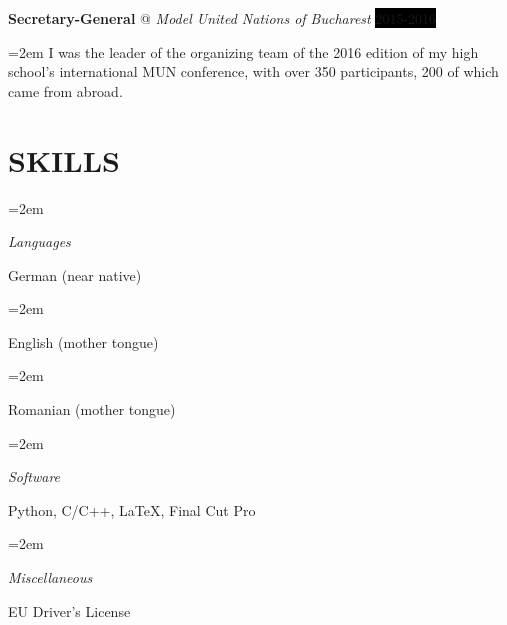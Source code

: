 \documentclass[paper=a4,fontsize=11pt]{scrartcl}
\makeatletter
\newlength{\spacebox}
\newcommand{\NewPart}[1]{\section*{\uppercase{#1}}}
\newcommand{\PersonalEntry}[2]{
		\noindent\hangindent=2em\hangafter=0 %
		\parbox{\spacebox}{        %
		\textit{#1}}		       %
		\hspace{1.5em} #2 \par}    %
\newcommand{\SkillsEntry}[2]{      %
		\noindent\hangindent=2em\hangafter=0 %
		\parbox{\spacebox}{        %
		\textit{#1}}			   %
		\hspace{1.5em} #2 \par}    %
\newcommand{\EducationEntry}[4]{
		\noindent \textbf{#1} \hfill      %
		\colorbox{Black}{%
			\parbox{6em}{%
			\hfill\color{White}#2}} \par  %
		\noindent \textit{#3} \par        %
		\noindent\hangindent=2em\hangafter=0 \small #4 %
		\normalsize \par}
\newcommand{\WorkEntry}[4]{				  %
		\noindent \textbf{#1} @ \textit{#3} \hfill      %
		\colorbox{Black}{\color{White}#2} \par  %
		\noindent\hangindent=2em\hangafter=0 \small #4 %
		\normalsize \par}
\makeatother
\begin{document}
\WorkEntry{Secretary-General}{2015-2016}{Model United Nations of Bucharest}{ I was the leader of the organizing team of the 2016 edition of my high school’s international MUN conference, with over 350 participants, 200 of which came from abroad.}

\NewPart{Skills}{}

\SkillsEntry{Languages}{German (near native)}
\SkillsEntry{}{English (mother tongue)}
\SkillsEntry{}{Romanian (mother tongue)}

\SkillsEntry{Software}{Python, \textsc{C/C++}, \LaTeX, Final Cut Pro}
\SkillsEntry{Miscellaneous}{EU Driver's License}


\end{document}
